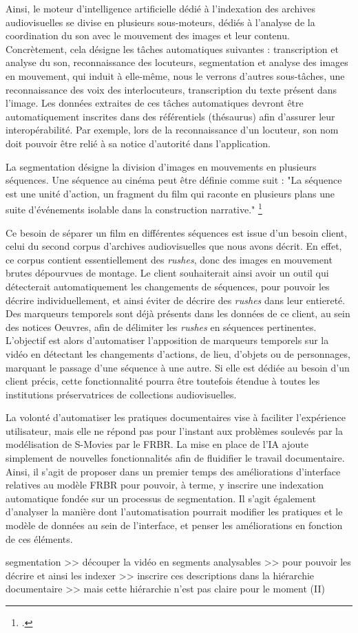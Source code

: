 Ainsi, le moteur d'intelligence artificielle dédié à l'indexation des archives audiovisuelles se divise en plusieurs sous-moteurs, dédiés à l'analyse de la coordination du son avec le mouvement des images et leur contenu. Concrètement, cela désigne les tâches automatiques suivantes : transcription et analyse du son, reconnaissance des locuteurs, segmentation et analyse des images en mouvement, qui induit à elle-même, nous le verrons d'autres sous-tâches, une reconnaissance des voix des interlocuteurs, transcription du texte présent dans l'image. Les données extraites de ces tâches automatiques devront être automatiquement inscrites dans des référentiels (thésaurus) afin d'assurer leur interopérabilité. Par exemple, lors de la reconnaissance d'un locuteur, son nom doit pouvoir être relié à sa notice d'autorité dans l'application.  

La segmentation désigne la division d'images en mouvements en plusieurs séquences. Une séquence au cinéma peut être définie comme suit : "La séquence est une unité d'action, un fragment du film qui raconte en plusieurs plans une suite d'événements isolable dans la construction narrative." \footcite{journot2008} 

Ce besoin de séparer un film en différentes séquences est issue d'un besoin client, celui du second corpus d'archives audiovisuelles que nous avons décrit. En effet, ce corpus contient essentiellement des \textit{rushes}, donc des images en mouvement brutes dépourvues de montage. Le client souhaiterait ainsi avoir un outil qui détecterait automatiquement les changements de séquences, pour pouvoir les décrire individuellement, et ainsi éviter de décrire des \textit{rushes} dans leur entiereté. Des marqueurs temporels sont déjà présents dans les données de ce client, au sein des notices Oeuvres, afin de délimiter les \textit{rushes} en séquences pertinentes. L'objectif est alors d'automatiser l'apposition de marqueurs temporels sur la vidéo en détectant les changements d'actions, de lieu, d'objets ou de personnages, marquant le passage d'une séquence à une autre. Si elle est dédiée au besoin d'un client précis, cette fonctionnalité pourra être toutefois étendue à toutes les institutions préservatrices de collections audiovisuelles. 

La volonté d'automatiser les pratiques documentaires vise à faciliter l'expérience utilisateur, mais elle ne répond pas pour l'instant aux problèmes soulevés par la modélisation de S-Movies par le FRBR. La mise en place de l'IA ajoute simplement de nouvelles fonctionnalités afin de fluidifier le travail documentaire. Ainsi, il s'agit de proposer dans un premier temps des améliorations d'interface relatives au modèle FRBR pour pouvoir, à terme, y inscrire une indexation automatique fondée sur un processus de segmentation. Il s'agit également d'analyser la manière dont l'automatisation pourrait modifier les pratiques et le modèle de données au sein de l'interface, et penser les améliorations en fonction de ces éléments. 



segmentation >> découper la vidéo en segments analysables >> pour pouvoir les décrire et ainsi les indexer >> inscrire ces descriptions dans la hiérarchie documentaire >> mais cette hiérarchie n'est pas claire pour le moment (II) 


